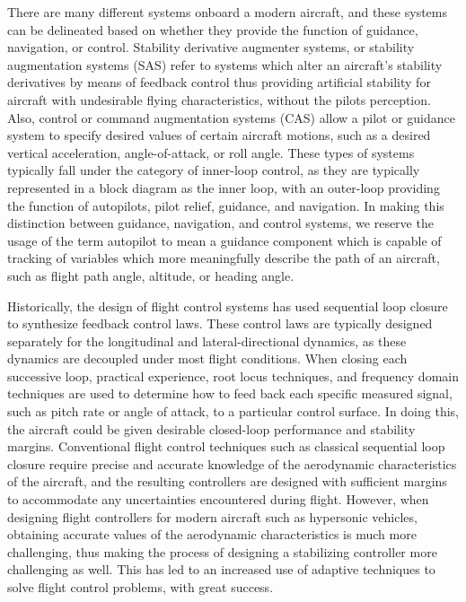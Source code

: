 \documentclass[]{../sty/aiaa-tc}
\theoremstyle{examplestyle}
\begin{document}
  There are many different systems onboard a modern aircraft, and these systems can be delineated based on whether they provide the function of guidance, navigation, or control.
  Stability derivative augmenter systems, or stability augmentation systems (SAS) refer to systems which alter an aircraft's stability derivatives by means of feedback control thus providing artificial stability for aircraft with undesirable flying characteristics, without the pilots perception.\cite{mclean.flightcontrol.1990,nelson.flightcontrol.1998,abzug.stability.2005}
  Also, control or command augmentation systems (CAS) allow a pilot or guidance system to specify desired values of certain aircraft motions, such as a desired vertical acceleration, angle-of-attack, or roll angle.
  These types of systems typically fall under the category of inner-loop control, as they are typically represented in a block diagram as the inner loop, with an outer-loop providing the function of autopilots, pilot relief, guidance, and navigation.\cite{yechout.flightmechanics.2003}
  In making this distinction between guidance, navigation, and control systems, we reserve the usage of the term autopilot to mean a guidance component which is capable of tracking of variables which more meaningfully describe the path of an aircraft, such as flight path angle, altitude, or heading angle.

  Historically, the design of flight control systems has used sequential loop closure to synthesize feedback control laws.
  These control laws are typically designed separately for the longitudinal and lateral-directional dynamics, as these dynamics are decoupled under most flight conditions.\cite{stevenslewis.aircraftcontrol.2003}
  When closing each successive loop, practical experience, root locus techniques, and frequency domain techniques are used to determine how to feed back each specific measured signal, such as pitch rate or angle of attack, to a particular control surface.
  In doing this, the aircraft could be given desirable closed-loop performance and stability margins.
  Conventional flight control techniques such as classical sequential loop closure require precise and accurate knowledge of the aerodynamic characteristics of the aircraft, and the resulting controllers are designed with sufficient margins to accommodate any uncertainties encountered during flight.
  However, when designing flight controllers for modern aircraft such as hypersonic vehicles, obtaining accurate values of the aerodynamic characteristics is much more challenging, thus making the process of designing a stabilizing controller more challenging as well.
  This has led to an increased use of adaptive techniques to solve flight control problems, with great success.\cite{lavretskywise.book.2013}
\end{document}

